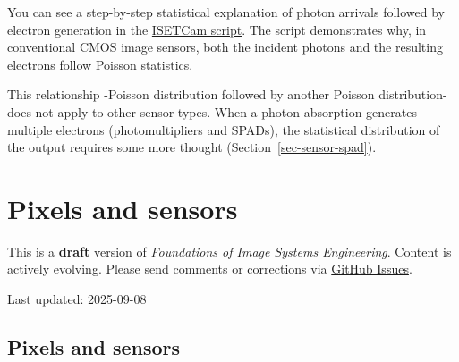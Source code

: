 \documentclass[
  letterpaper,
]{book}
\begin{document}
\begin{tcolorbox}[enhanced jigsaw, opacityback=0, breakable, coltitle=black, leftrule=.75mm, left=2mm, colframe=quarto-callout-note-color-frame, opacitybacktitle=0.6, bottomtitle=1mm, bottomrule=.15mm, toprule=.15mm, title=\textcolor{quarto-callout-note-color}{\faInfo}\hspace{0.5em}{ISETCam: shot noise}, titlerule=0mm, toptitle=1mm, colback=white, rightrule=.15mm, colbacktitle=quarto-callout-note-color!10!white, arc=.35mm]

You can see a step-by-step statistical explanation of photon arrivals
followed by electron generation in the
\href{../code/fise_photonsElectrons.html}{ISETCam script}. The script
demonstrates why, in conventional CMOS image sensors, both the incident
photons and the resulting electrons follow Poisson statistics.

This relationship -Poisson distribution followed by another Poisson
distribution- does not apply to other sensor types. When a photon
absorption generates multiple electrons (photomultipliers and SPADs),
the statistical distribution of the output requires some more thought
(Section~\ref{sec-sensor-spad}).

\end{tcolorbox}

\chapter{Pixels and sensors}\label{sec-pixels}

\begin{tcolorbox}[enhanced jigsaw, opacityback=0, breakable, coltitle=black, leftrule=.75mm, left=2mm, colframe=quarto-callout-warning-color-frame, opacitybacktitle=0.6, bottomtitle=1mm, bottomrule=.15mm, toprule=.15mm, title=\textcolor{quarto-callout-warning-color}{\faExclamationTriangle}\hspace{0.5em}{Work in Progress}, titlerule=0mm, toptitle=1mm, colback=white, rightrule=.15mm, colbacktitle=quarto-callout-warning-color!10!white, arc=.35mm]

This is a \textbf{draft} version of \emph{Foundations of Image Systems
Engineering}. Content is actively evolving. Please send comments or
corrections via \href{https://github.com/wandell/FISE-git/issues}{GitHub
Issues}.

Last updated: 2025-09-08

\end{tcolorbox}

\section{Pixels and sensors}\label{sec-pixels-overview}
\end{document}
